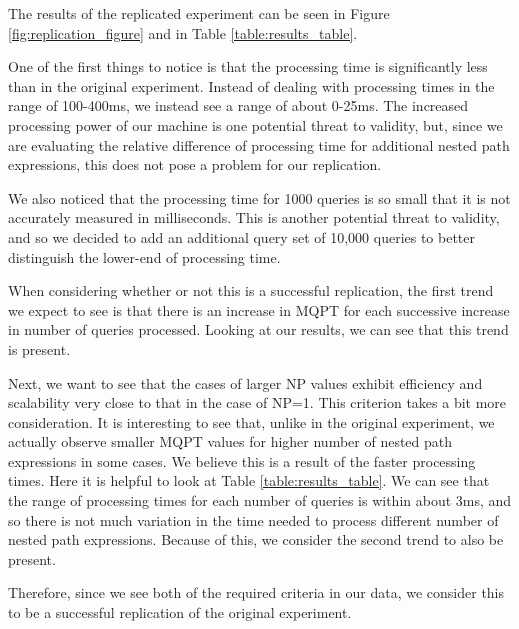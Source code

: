 \documentclass[sigconf, nonacm]{acmart}
\begin{document}
The results of the replicated experiment can be seen in Figure \ref{fig:replication_figure} and in Table \ref{table:results_table}.

One of the first things to notice is that the processing time is significantly less than in the original experiment. Instead of dealing with processing times in the range of 100-400ms, we instead see a range of about 0-25ms. The increased processing power of our machine is one potential threat to validity, but, since we are evaluating the relative difference of processing time for additional nested path expressions, this does not pose a problem for our replication.

We also noticed that the processing time for 1000 queries is so small that it is not accurately measured in milliseconds. This is another potential threat to validity, and so we decided to add an additional query set of 10,000 queries to better distinguish the lower-end of processing time.

When considering whether or not this is a successful replication, the first trend we expect to see is that there is an increase in MQPT for each successive increase in number of queries processed. Looking at our results, we can see that this trend is present.

Next, we want to see that the cases of larger NP values exhibit efficiency and scalability very close to that in the case of NP=1.
This criterion takes a bit more consideration. It is interesting to see that, unlike in the original experiment, we actually observe smaller MQPT values for higher number of nested path expressions in some cases. We believe this is a result of the faster processing times. Here it is helpful to look at Table \ref{table:results_table}. We can see that the range of processing times for each number of queries is within about 3ms, and so there is not much variation in the time needed to process different number of nested path expressions. Because of this, we consider the second trend to also be present.

Therefore, since we see both of the required criteria in our data, we consider this to be a successful replication of the original experiment.



\end{document}
